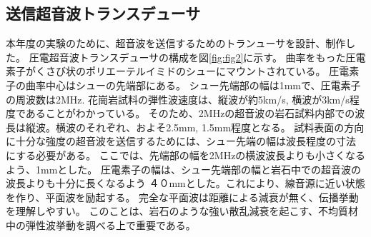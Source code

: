 \subsection{送信超音波トランスデューサ}
本年度の実験のために、超音波を送信するためのトランューサを設計、制作した。
圧電超音波トランスデューサの構成を図\ref{fig:fig2}に示す。
曲率をもった圧電素子がくさび状のポリエーテルイミドのシューにマウントされている。
圧電素子の曲率中心はシューの先端部にある。
シュー先端部の幅は1mmで、圧電素子の周波数は2MHz.
花崗岩試料の弾性波速度は、縦波が約5km/s, 横波が3km/s程度であることがわかっている。
そのため、2MHzの超音波の岩石試料内部での波長は縦波。横波のそれぞれ、およそ2.5mm, 1.5mm程度となる。
試料表面の方向に十分な強度の超音波を送信するためには、シュー先端の幅は波長程度の寸法にする必要がある。
ここでは、先端部の幅を2MHzの横波波長よりも小さくなるよう、1mmとした。
圧電素子の幅は、シュー先端部の幅と岩石中での超音波の波長よりも十分に長くなるよう
４０mmとした。これにより、線音源に近い状態を作り、平面波を励起する。
完全な平面波は距離による減衰が無く、伝播挙動を理解しやすい。
このことは、岩石のような強い散乱減衰を起こす、不均質材中の弾性波挙動を調べる上で重要である。





